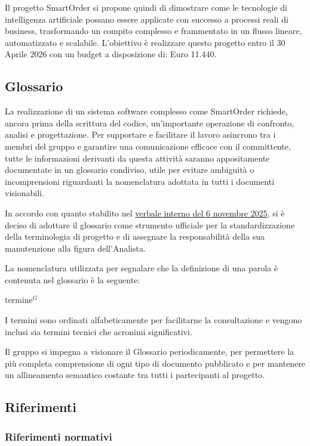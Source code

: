 	Il progetto SmartOrder si propone quindi di dimostrare come le tecnologie di intelligenza artificiale possano essere applicate con successo a processi reali di business, trasformando un compito complesso e frammentato in un flusso lineare, automatizzato e scalabile. L'obiettivo è realizzare questo progetto entro il 30 Aprile 2026 con un budget a disposizione di: Euro 11.440.
	
\subsection{Glossario}
    La realizzazione di un sistema software complesso come SmartOrder richiede, ancora prima della scrittura del codice, un'importante operazione di confronto, analisi e progettazione. Per supportare e facilitare il lavoro asincrono tra i membri del gruppo e garantire una comunicazione efficace con il committente, tutte le informazioni derivanti da questa attività saranno appositamente documentate in un glossario condiviso, utile per evitare ambiguità o incomprensioni riguardanti la nomenclatura adottata in tutti i documenti visionabili.

    In accordo con quanto stabilito nel \href{https://nullpointersgroup.github.io/Documentazione/output/RTB/Verbali%20Interni/2025-11-06_verbale_interno.pdf}{verbale interno del 6 novembre 2025}, si è deciso 
	di adottare il glossario come strumento ufficiale per la standardizzazione della terminologia di progetto e di assegnare la responsabilità della sua manutenzione alla figura dell'Analista.

    La nomenclatura utilizzata per segnalare che la definizione di una parola è contenuta nel glossario è la seguente: 
    \begin{center}
        termine$^{G}$
    \end{center}

    I termini sono ordinati alfabeticamente per facilitarne la consultazione e vengono inclusi sia termini tecnici che acronimi significativi.

    Il gruppo si impegna a visionare il Glossario periodicamente, per permettere la più completa comprensione di ogni tipo di documento pubblicato e per mantenere un allineamento semantico costante tra tutti i partecipanti al progetto. 

    \subsection{Riferimenti}
	\subsubsection{Riferimenti normativi}

